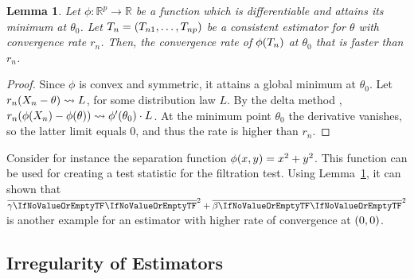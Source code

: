 \documentclass[ejs, twoside]{imsart}
\theoremstyle{plain}
\newtheorem{lemma}[theorem]{Lemma}
\theoremstyle{remark}
\newcommand{\real}{\mathbb{R}}
\newcommand{\estim}[1]{\avg{\regcoef{#1}}}
\numberwithin{equation}{section}
\numberwithin{table}{section}
\numberwithin{figure}{section}
\let\originalleft\left
\let\originalright\right
\renewcommand{\left}{\mathopen{}\mathclose\bgroup\originalleft}
\renewcommand{\right}{\aftergroup\egroup\originalright}
\begin{document}
\begin{lemma} \label{lem:higherrate}
	Let \(\phi:\real^p\rightarrow\real\) be a function which is differentiable and attains its minimum at \(\theta_0\). Let \(T_n = \left( T_{n1},\dots,T_{np} \right) \) be a consistent estimator for \(\theta\) with convergence rate \(r_n\). Then, the convergence rate of \(\phi\left( T_n \right)\) at \(\theta_0\) that is faster than \(r_n\).
\end{lemma}

\begin{proof}
	Since \(\phi\) is convex and symmetric, it attains a global minimum at \(\theta_0\). Let \(r_n\left( X_n - \theta \right) \convdist L\), for some distribution law \(L\). By the delta method \citep[Theorem~3.1]{van_der_vaart_asymptotic_1998}, \(r_n\left( \phi\left( X_n\right)  - \phi\left( \theta \right)\right) \convdist \phi'\left(\theta_0 \right) \cdot L \).
	At the minimum point \(\theta_0\) the derivative vanishes, so the latter limit equals 0, and thus the rate is higher than \(r_n\).
\end{proof}

 Consider for instance the separation function \(\phi\left(x,y \right) = x^2 + y^2 \). This function can be used for creating a test statistic for the filtration test. Using Lemma~\ref{lem:higherrate}, it can shown that \( \estim{1}^2 + \estim{2}^2\) is another example for an estimator with higher rate of convergence at \(\left(0,0 \right) \).


	

	
\subsection{Irregularity of Estimators} \label{sec:rates-irreg}
\end{document}
